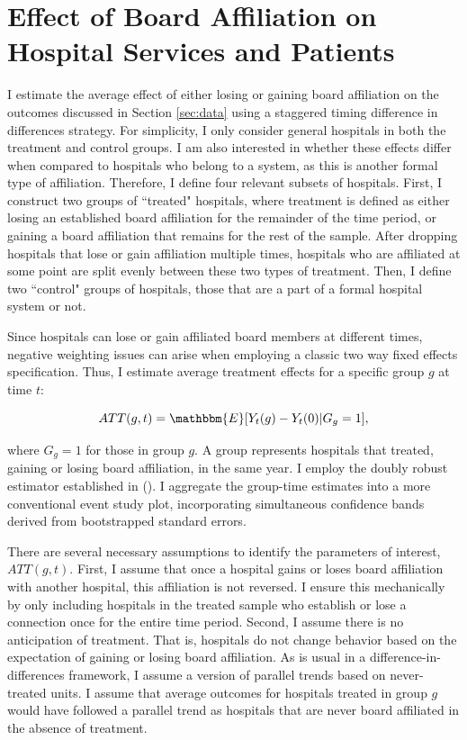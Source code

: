 \documentclass[12pt]{article}
\begin{document}
    \section{Effect of Board Affiliation on Hospital Services and Patients}

    I estimate the average effect of either losing or gaining board affiliation on the outcomes discussed in Section \ref{sec:data} using a staggered timing difference in differences strategy. For simplicity, I only consider general hospitals in both the treatment and control groups. I am also interested in whether these effects differ when compared to hospitals who belong to a system, as this is another formal type of affiliation. Therefore, I define four relevant subsets of hospitals. First, I construct two groups of ``treated" hospitals, where treatment is defined as either losing an established board affiliation for the remainder of the time period, or gaining a board affiliation that remains for the rest of the sample. After dropping hospitals that lose or gain affiliation multiple times, hospitals who are affiliated at some point are split evenly between these two types of treatment. Then, I define two ``control" groups of hospitals, those that are a part of a formal hospital system or not. 

    Since hospitals can lose or gain affiliated board members at different times, negative weighting issues can arise when employing a classic two way fixed effects specification. Thus, I estimate average treatment effects for a specific group $g$ at time $t$:
    
    $$ATT(g,t)=\mathbbm{E}[Y_t(g)-Y_t(0)|G_g=1],$$
    
    \noindent where $G_g=1$ for those in group $g$. A group represents hospitals that treated, gaining or losing board affiliation, in the same year. I employ the doubly robust estimator established in \citeauthor{sant2020doubly} (\citeyear{sant2020doubly}). I aggregate the group-time estimates into a more conventional event study plot, incorporating simultaneous confidence bands derived from bootstrapped standard errors. 

    There are several necessary assumptions to identify the parameters of interest, $ATT(g,t)$. First, I assume that once a hospital gains or loses board affiliation with another hospital, this affiliation is not reversed. I ensure this mechanically by only including hospitals in the treated sample who establish or lose a connection once for the entire time period. Second, I assume there is no anticipation of treatment. That is, hospitals do not change behavior based on the expectation of gaining or losing board affiliation. As is usual in a difference-in-differences framework, I assume a version of parallel trends based on never-treated units. I assume that average outcomes for hospitals treated in group $g$ would have followed a parallel trend as hospitals that are never board affiliated in the absence of treatment. 
\end{document}
